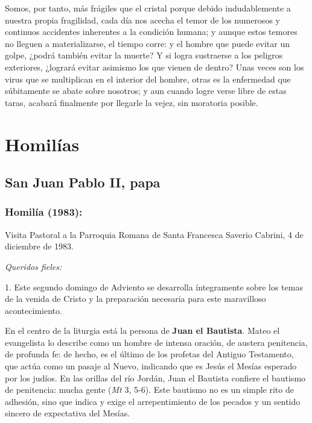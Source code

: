 \begin{body}
Somos, por tanto, más frágiles que el cristal porque debido indudablemente a nuestra propia fragilidad, cada día nos acecha el temor de los numerosos y continuos accidentes inherentes a la condición humana; y aunque estos temores no lleguen a materializarse, el tiempo corre: y el hombre que puede evitar un golpe, ¿podrá también evitar la muerte? Y si logra sustraerse a los peligros exteriores, ¿logrará evitar asimismo los que vienen de dentro? Unas veces son los virus que se multiplican en el interior del hombre, otras es la enfermedad que súbitamente se abate sobre nosotros; y aun cuando logre verse libre de estas taras, acabará finalmente por llegarle la vejez, sin moratoria posible.

\section{Homilías}

\subsection{San Juan Pablo II, papa}


	\subsubsection{Homilía (1983):} Visita Pastoral a la Parroquia Romana de Santa Francesca Saverio Cabrini, 4 de diciembre de 1983.

\begin{body}
	\emph{Queridos fieles:}
	
	1. Este segundo domingo de Adviento se desarrolla íntegramente sobre los temas de la venida de Cristo y la preparación necesaria para este maravilloso acontecimiento.
	
	En el centro de la liturgia está la persona de \textbf{Juan el Bautista}. Mateo el evangelista lo describe como un hombre de intensa oración, de austera penitencia, de profunda fe: de hecho, es el último de los profetas del Antiguo Testamento, que actúa como un pasaje al Nuevo, indicando que es Jesús el Mesías esperado por los judíos. En las orillas del río Jordán, Juan el Bautista confiere el bautismo de penitencia: mucha gente  (\emph{Mt} 3, 5-6). Este bautismo no es un simple rito de adhesión, sino que indica y exige el arrepentimiento de los pecados y un sentido sincero de expectativa del Mesías.
	

\end{body}
\end{body}
